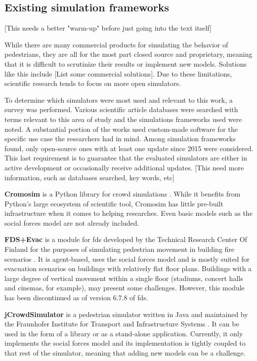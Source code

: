 \documentclass[twoside, 11pt]{article}
\begin{document}
\subsection{Existing simulation frameworks} \label{sec:existing-frameworks}

[This needs a better "warm-up" before just going into the text itself]

While there are many commercial products for simulating the behavior of pedestrians, they are all for the most part closed source and proprietary, meaning that it is difficult to scrutinize their results or implement new models. Solutions like this include [List some commercial solutions]. Due to these limitations, scientific research tends to focus on more open simulators. 

To determine which simulators were most used and relevant to this work, a survey was performed. Various scientific article databases were searched with terms relevant to this area of study and the simulations frameworks used were noted. A substantial portion of the works used custom-made software for the specific use case the researchers had in mind. Among simulation frameworks found, only open-source ones with at least one update since 2015 were considered. This last requirement is to guarantee that the evaluated simulators are either in active development or occasionally receive additional updates. [This need more information, such as databases searched, key words, etc]

\textbf{Cromosim} is a Python library for crowd simulations \cite{cromosim}. While it benefits from Python's large ecosystem of scientific tool, Cromosim has little pre-built infrastructure when it comes to helping researches. Even basic models such as the social forces model are not already included.

\textbf{FDS+Evac} is a module for \gls{fds} developed by the Technical Research Center Of Finland for the purposes of simulating pedestrian movement in building fire scenarios \cite{korhonenFireDynamicsSimulator2009}. It is agent-based, uses the social forces model and is mostly suited for evacuation scenarios on buildings with relatively flat floor plans. Buildings with a large degree of vertical movement within a single floor (stadiums, concert halls and cinemas, for example), may present some challenges. However, this module has been discontinued as of version 6.7.8 of \gls{fds}.

\textbf{jCrowdSimulator} is a pedestrian simulator written in Java and maintained by the Fraunhofer Institute for Transport and Infrastructure Systems \cite{meinert2019simulation}. It can be used in the form of a library or as a stand-alone application. Currently, it only implements the social forces model and its implementation is tightly coupled to that rest of the simulator, meaning that adding new models can be a challenge.
\end{document}
